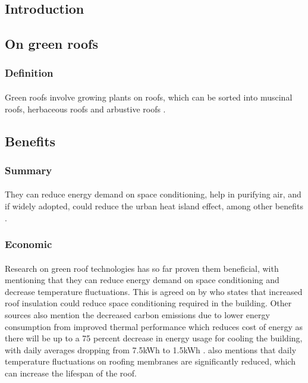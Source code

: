 \documentclass{article}
\begin{document}
\newpage

\tableofcontents

\newpage

\begin{multicols}{2}

  \section{Introduction}
  \subsection{On green roofs}
  \subsubsection{Definition}
  \paragraph{} Green roofs involve growing plants on roofs, which can
  be sorted into muscinal roofs, herbaceous roofs and arbustive roofs
  \parencite{ecoeng}.


  \subsection{Benefits}
  \subsubsection{Summary}
  \paragraph{} They can reduce energy demand on space conditioning,
  help in purifying air, and if widely adopted, could reduce the urban
  heat island effect, among other benefits \parencite{energeff}.


  \subsubsection{Economic}
  \paragraph{} Research on green roof technologies has so far proven them
  beneficial, with \cite{energeff} mentioning that they can reduce energy
  demand on space conditioning and decrease temperature fluctuations. This
  is agreed on by \cite{CFGRSG} who states that increased roof insulation
  could reduce space conditioning required in the building. Other
  sources also mention the decreased carbon emissions due to lower energy
  consumption from improved thermal performance \parencite{CommAwareGBSyd}
  which reduces cost of energy as there will be up to a 75 percent
  decrease in energy usage for cooling the building, with daily averages
  dropping from 7.5kWh to 1.5kWh \parencite{energeff}. \cite{energeff} also
  mentions that daily temperature fluctuations on roofing membranes are
  significantly reduced, which can increase the lifespan of the roof.



\end{multicols}
\end{document}
